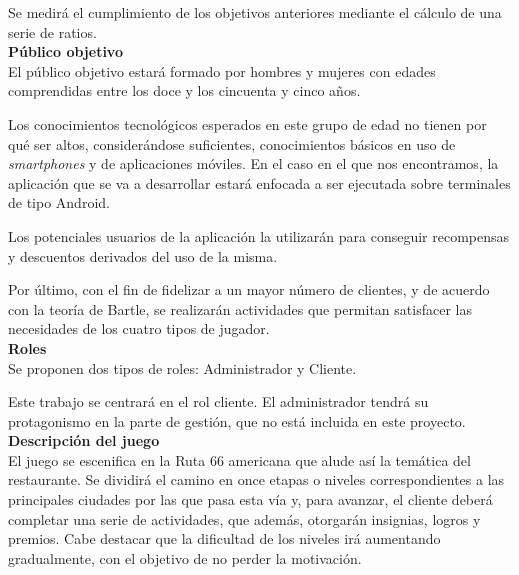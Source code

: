 \documentclass[twoside]{report}
\begin{document}
Se medirá el cumplimiento de los objetivos anteriores mediante el cálculo de una serie de ratios.\\

\textbf{Público objetivo}\\

El público objetivo estará formado por hombres y mujeres con edades comprendidas entre los doce y los cincuenta y cinco años. 

Los conocimientos tecnológicos esperados en este grupo de edad no tienen por qué ser altos, considerándose suficientes, conocimientos básicos en uso de \textit{smartphones} y de aplicaciones móviles. En el caso en el que nos encontramos, la aplicación que se va a desarrollar estará enfocada a ser ejecutada sobre terminales de tipo Android.

Los potenciales usuarios de la aplicación la utilizarán para conseguir recompensas y descuentos derivados del uso de la misma.

Por último, con el fin de fidelizar a un mayor número de clientes, y de acuerdo con la \cite{iebsctj} teoría de Bartle\cite{iebsctj}, se realizarán actividades que permitan satisfacer las necesidades de los cuatro tipos de jugador.\\

\textbf{Roles}\\

Se proponen dos tipos de roles: Administrador y Cliente.

Este trabajo se centrará en el rol cliente. El administrador tendrá su protagonismo en la parte de gestión, que no está incluida en este proyecto.\\

\textbf{Descripción del juego}\\

El juego se escenifica en la Ruta 66 americana que alude así la temática del restaurante. Se dividirá el camino en once etapas o niveles correspondientes a las principales ciudades por las que pasa esta vía y, para avanzar, el cliente deberá completar una serie de actividades, que además, otorgarán insignias, logros y premios. Cabe destacar que la dificultad de los niveles irá aumentando gradualmente, con el objetivo de no perder la motivación.
\end{document}
